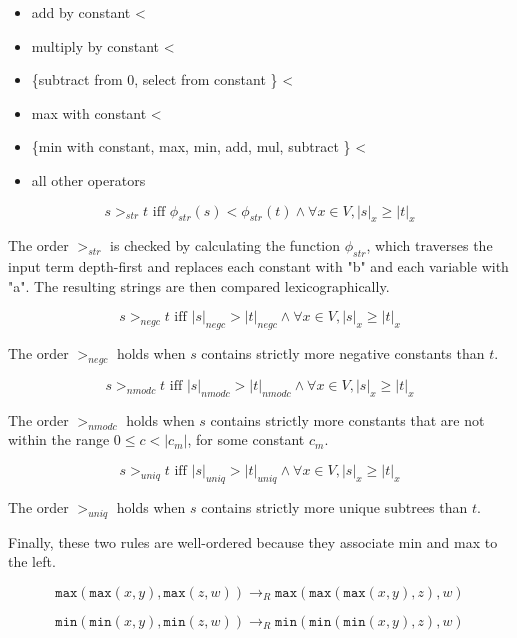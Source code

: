 \documentclass[acmsmall,review,anonymous]{acmart}\settopmatter{printfolios=true,printccs=false,printacmref=false}
\begin{document}
\begin{itemize}
  \item add by constant <
  \item multiply by constant <
  \item \{subtract from 0, select from constant \} < 
  \item max with constant <
  \item \{min with constant, max, min, add, mul, subtract \} <
  \item all other operators
\end{itemize}

\begin{equation}
s >_{str} t \textrm{ iff } \phi_{str}(s) < \phi_{str}(t) \wedge \forall x \in V, |s|_x \geq |t|_x
\end{equation}

The order $>_{str}$ is checked by calculating the function $\phi_{str}$, which traverses the input term depth-first and replaces each constant with "b" and each variable with "a". The resulting strings are then compared lexicographically.

\begin{equation}
s >_{negc} t \textrm{ iff } |s|_{negc} > |t|_{negc}  \wedge \forall x \in V, |s|_x \geq |t|_x
\end{equation}

The order $>_{negc}$ holds when $s$ contains strictly more negative constants than $t$.

\begin{equation}
s >_{nmodc} t \textrm{ iff } |s|_{nmodc} > |t|_{nmodc}  \wedge \forall x \in V, |s|_x \geq |t|_x
\end{equation}

The order $>_{nmodc}$ holds when $s$ contains strictly more constants that are not within the range $0 \leq c < |c_m|$, for some constant $c_m$. 

\begin{equation}
s >_{uniq} t \textrm{ iff } |s|_{uniq} > |t|_{uniq}  \wedge \forall x \in V, |s|_x \geq |t|_x
\end{equation}

The order $>_{uniq}$ holds when $s$ contains strictly more unique subtrees than $t$.

Finally, these two rules are well-ordered because they associate min and max to the left.

\begin{equation}
\tag{max106}
\texttt{max}(\texttt{max}(x,y), \texttt{max}(z,w)) \rightarrow_R \texttt{max}(\texttt{max}(\texttt{max}(x,y),z),w)
\end{equation}

\begin{equation}
\tag{min106}
\texttt{min}(\texttt{min}(x,y), \texttt{min}(z,w)) \rightarrow_R \texttt{min}(\texttt{min}(\texttt{min}(x,y),z),w)
\end{equation}
\end{document}
